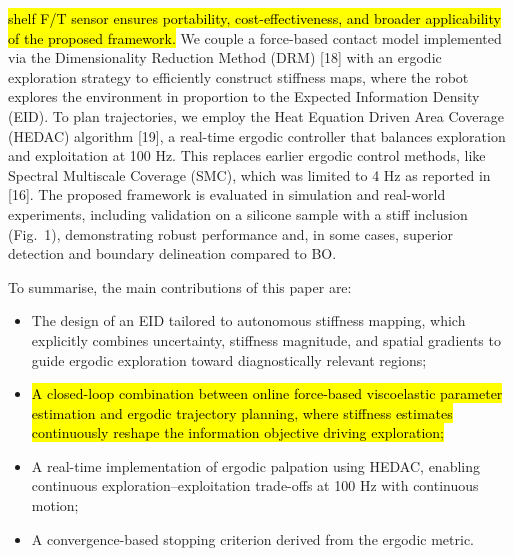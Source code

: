 \documentclass[11pt]{article}
\begin{document}
\hl{shelf F/T sensor ensures portability, cost-effectiveness, and broader
applicability of the proposed framework.} We couple a force-based
contact model implemented via the Dimensionality Reduction Method
(DRM) [18] with an ergodic exploration strategy to efficiently
construct stiffness maps, where the robot explores the environment
in proportion to the Expected Information Density (EID). To plan
trajectories, we employ the Heat Equation Driven Area Coverage
(HEDAC) algorithm [19], a real-time ergodic controller that balances
exploration and exploitation at 100 Hz. This replaces earlier ergodic
control methods, like Spectral Multiscale Coverage (SMC), which was
limited to 4 Hz as reported in [16]. The proposed framework is
evaluated in simulation and real-world experiments, including
validation on a silicone sample with a stiff inclusion (Fig.~1),
demonstrating robust performance and, in some cases, superior
detection and boundary delineation compared to BO.

To summarise, the main contributions of this paper are:
\begin{itemize}
\item The design of an EID tailored to autonomous stiffness mapping,
  which explicitly combines uncertainty, stiffness magnitude, and
  spatial gradients to guide ergodic exploration toward diagnostically
  relevant regions;
\item {}\hl{A closed-loop combination between online force-based
  viscoelastic parameter estimation and ergodic trajectory planning,
  where stiffness estimates continuously reshape the information
  objective driving exploration;}
\item A real-time implementation of ergodic palpation using HEDAC,
  enabling continuous exploration--exploitation trade-offs at 100 Hz
  with continuous motion;
\item A convergence-based stopping criterion derived from the
  ergodic metric.
\end{itemize}
\end{document}
